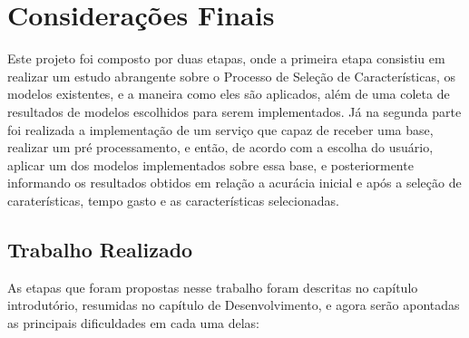 \chapter[Considerações Finais]{Considerações Finais}

Este projeto foi composto por duas etapas, onde a primeira etapa consistiu em realizar um estudo abrangente sobre o Processo de Seleção de Características, os modelos existentes, e a maneira como eles são aplicados, além de uma coleta de resultados de modelos escolhidos para serem implementados. Já na segunda parte foi realizada a implementação de um serviço que capaz de receber uma base, realizar um pré processamento, e então, de acordo com a escolha do usuário, aplicar um dos modelos implementados sobre essa base, e posteriormente informando os resultados obtidos em relação a acurácia inicial e após a seleção de caraterísticas, tempo gasto e as características selecionadas.

\section{Trabalho Realizado}

As etapas que foram propostas nesse trabalho foram descritas no capítulo introdutório, resumidas no capítulo de Desenvolvimento, e agora serão apontadas as principais dificuldades em cada uma delas:

